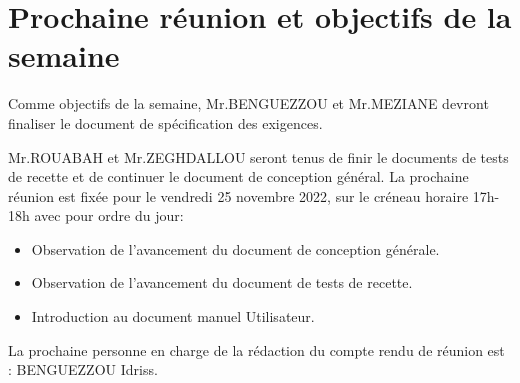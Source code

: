 \documentclass[a4paper, 12pt]{article}
\begin{document}
\section{Prochaine réunion et objectifs de la semaine}
Comme objectifs de la semaine, Mr.BENGUEZZOU et Mr.MEZIANE devront finaliser le document de spécification des exigences.

Mr.ROUABAH et Mr.ZEGHDALLOU seront tenus de finir le documents de tests de recette et de continuer le document de conception général.
\newpage La prochaine réunion est fixée pour le vendredi 25 novembre 2022, sur le créneau horaire 17h-18h avec pour ordre du jour: \\

\begin{itemize}
    \item Observation de l'avancement du document de conception générale.
    \item Observation de l'avancement du document de tests de recette.
    \item Introduction au document manuel Utilisateur.
\end{itemize}

La prochaine personne en charge de la rédaction du compte rendu de réunion est : BENGUEZZOU Idriss.
\end{document}
